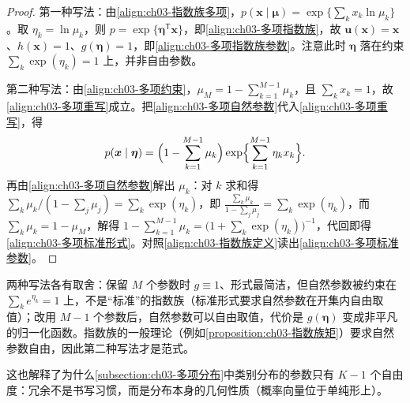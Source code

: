 \documentclass[../../main.tex]{subfiles}
\begin{document}
\begin{proof}
第一种写法：由\eqref{align:ch03-指数族多项}，$p(\boldsymbol{x}\mid\boldsymbol{\mu})=\exp\{\sum_k x_k\ln\mu_k\}$。取 $\eta_k=\ln\mu_k$，则 $p=\exp\{\boldsymbol{\eta}^{\mathsf{T}}\boldsymbol{x}\}$，即\eqref{align:ch03-多项指数族}，故 $\boldsymbol{u}(\boldsymbol{x})=\boldsymbol{x}$、$h(\boldsymbol{x})=1$、$g(\boldsymbol{\eta})=1$，即\eqref{align:ch03-多项指数族参数}。注意此时 $\boldsymbol{\eta}$ 落在约束 $\sum_k\exp(\eta_k)=1$ 上，并非自由参数。

第二种写法：由\eqref{align:ch03-多项约束}，$\mu_M=1-\sum_{k=1}^{M-1}\mu_k$，且 $\sum_k x_k=1$，故\eqref{align:ch03-多项重写}成立。把\eqref{align:ch03-多项自然参数}代入\eqref{align:ch03-多项重写}，得
\begin{align*}
p(\boldsymbol{x}\mid\boldsymbol{\eta})=\Bigl(1-\sum_{k=1}^{M-1}\mu_k\Bigr)\exp\Bigl\{\sum_{k=1}^{M-1}\eta_k x_k\Bigr\}.
\end{align*}
再由\eqref{align:ch03-多项自然参数}解出 $\mu_k$：对 $k$ 求和得 $\sum_k\mu_k/(1-\sum_j\mu_j)=\sum_k\exp(\eta_k)$，即 $\frac{\sum_k\mu_k}{1-\sum_j\mu_j}=\sum_k\exp(\eta_k)$，而 $\sum_k\mu_k=1-\mu_M$，解得 $1-\sum_{k=1}^{M-1}\mu_k=\bigl(1+\sum_k\exp(\eta_k)\bigr)^{-1}$，代回即得\eqref{align:ch03-多项标准形式}。对照\eqref{align:ch03-指数族定义}读出\eqref{align:ch03-多项标准参数}。
\end{proof}

\begin{remark}
两种写法各有取舍：保留 $M$ 个参数时 $g\equiv1$、形式最简洁，但自然参数被约束在 $\sum_k e^{\eta_k}=1$ 上，不是“标准”的指数族（标准形式要求自然参数在开集内自由取值）；改用 $M-1$ 个参数后，自然参数可以自由取值，代价是 $g(\boldsymbol{\eta})$ 变成非平凡的归一化函数。指数族的一般理论（例如\cref{proposition:ch03-指数族矩}）要求自然参数自由，因此第二种写法才是范式。

这也解释了为什么\cref{subsection:ch03-多项分布}中类别分布的参数只有 $K-1$ 个自由度：冗余不是书写习惯，而是分布本身的几何性质（概率向量位于单纯形上）。
\end{remark}
\end{document}

